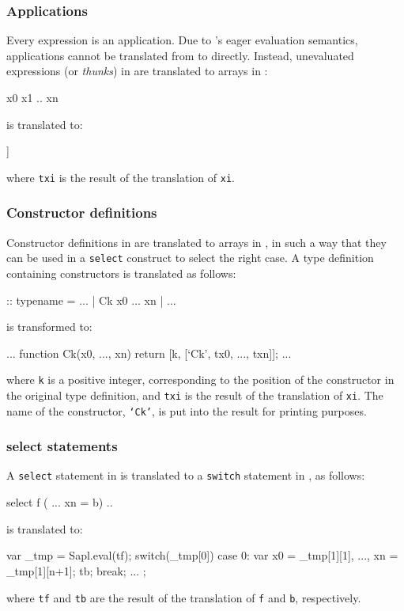\subsubsection{Applications} 
Every \Sapl expression is an application. Due to \JS's eager 
evaluation semantics, applications cannot be translated from \Sapl to 
\JS directly. Instead, unevaluated expressions (or \emph{thunks}) in \Sapl are translated to arrays in \JS:
\begin{CleanCode}
x0 x1 .. xn 
\end{CleanCode}
is translated to:
\begin{CleanCode}
[tx0, [tx1, ..., txn]]
\end{CleanCode}
where \texttt{txi} is the result of the translation of \texttt{xi}.

\subsubsection{Constructor definitions} 
Constructor definitions in \Sapl are translated to arrays in \JS, in such a way 
that they can be used in a \texttt{select} construct to select the right case. 
A \Sapl type definition containing constructors is translated as follows:
\begin{CleanCode}
:: typename = ... | Ck x0 ... xn | ...
\end{CleanCode}
is transformed to:
\begin{CleanCode}
... function Ck(x0, ..., xn) { return [k, [`Ck', tx0, ..., txn]]; } ...
\end{CleanCode}
where \texttt{k} is a positive integer, corresponding to the position of the 
constructor in the original type definition, 
and \texttt{txi} is the result of the translation of \texttt{xi}. 
The name of the constructor, \texttt{`Ck'}, is 
put into the result for printing purposes.

\subsubsection{\textsf{select} statements} 
A \texttt{select} statement in \Sapl is translated to a \texttt{switch} 
statement in \JS, as follows:
\begin{CleanCode}
select f ( ... xn = b) ..
\end{CleanCode}
is translated to:
\begin{CleanCode}
var _tmp = Sapl.eval(tf);
switch(_tmp[0]) {
	case 0: var x0 = _tmp[1][1], ..., xn = _tmp[1][n+1];
	        tb;
            break;
	...
};
\end{CleanCode}
where \texttt{tf} and \texttt{tb} are the result of the translation of
\texttt{f} and \texttt{b}, respectively. 

